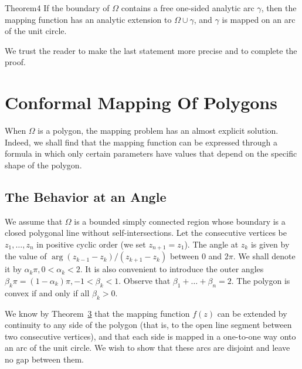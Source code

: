 \begin{originalstatement}{Theorem}{4}\label{thm:6.4}
If the boundary of $\Omega$ contains a free one-sided analytic arc $\gamma$, then the mapping function has an analytic extension to $\Omega \cup \gamma$, and $\gamma$ is mapped on an arc of the unit circle.
\end{originalstatement}
We trust the reader to make the last statement more precise and to complete the proof.

\setcounter{section}{1}\section{Conformal Mapping Of Polygons}\label{sec:6.2}
When $\Omega$ is a polygon, the mapping problem has an almost explicit solution. Indeed, we shall find that the mapping function can be expressed through a formula in which only certain parameters have values that depend on the specific shape of the polygon.

\setcounter{section}{2}\setcounter{subsection}{0}\subsection{The Behavior at an Angle}\label{sec:6.2.1}
We assume that $\Omega$ is a bounded simply connected region whose boundary is a closed polygonal line without self-intersections. Let the consecutive vertices be $z_{1},\ldots ,z_{n}$ in positive cyclic order (we set $z_{n + 1} = z_1$). The angle at $z_{k}$ is given by the value of $\arg (z_{k - 1} - z_k) / (z_{k + 1} - z_k)$ between 0 and $2\pi$. We shall denote it by $\alpha_{k}\pi,0 < \alpha_{k} < 2$. It is also convenient to introduce the outer angles $\beta_{k}\pi = (1 - \alpha_{k})\pi, - 1 < \beta_{k} < 1$. Observe that $\beta_{1} + \dots +\beta_{n} = 2$. The polygon is convex if and only if all $\beta_{k} > 0$.

We know by Theorem~\hyperref[thm:6.3]{3} that the mapping function $f(z)$ can be extended by continuity to any side of the polygon (that is, to the open line segment between two consecutive vertices), and that each side is mapped in a one-to-one way onto an arc of the unit circle. We wish to show that these arcs are disjoint and leave no gap between them.

